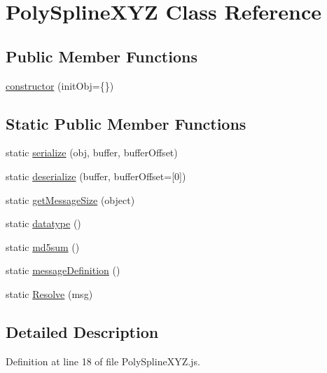 \hypertarget{class_poly_spline_x_y_z}{}\section{Poly\+Spline\+X\+YZ Class Reference}
\label{class_poly_spline_x_y_z}
\subsection*{Public Member Functions}
\begin{DoxyCompactItemize}
\item 
\hyperlink{class_poly_spline_x_y_z_a9f4d8d7d7d7d21141967cfa257d5d10b}{constructor} (init\+Obj=\{\})
\end{DoxyCompactItemize}
\subsection*{Static Public Member Functions}
\begin{DoxyCompactItemize}
\item 
static \hyperlink{class_poly_spline_x_y_z_a893425ffcaa6422399986ef9c54a4143}{serialize} (obj, buffer, buffer\+Offset)
\item 
static \hyperlink{class_poly_spline_x_y_z_adb999f8db5c294fe0ccb7a9ea2df6eb0}{deserialize} (buffer, buffer\+Offset=\mbox{[}0\mbox{]})
\item 
static \hyperlink{class_poly_spline_x_y_z_aa6e3cda5b53c89f2b01584886b3f8352}{get\+Message\+Size} (object)
\item 
static \hyperlink{class_poly_spline_x_y_z_a851cf835486d3baf87a903ebfc54148e}{datatype} ()
\item 
static \hyperlink{class_poly_spline_x_y_z_af3bfd728ed6ec2ec81ae53e06bdf4017}{md5sum} ()
\item 
static \hyperlink{class_poly_spline_x_y_z_aa6d28fbc1cc4c796ae67e4bfb1a79dea}{message\+Definition} ()
\item 
static \hyperlink{class_poly_spline_x_y_z_a3b5b82069a46c5d9b04613b76d186d33}{Resolve} (msg)
\end{DoxyCompactItemize}


\subsection{Detailed Description}


Definition at line 18 of file Poly\+Spline\+X\+Y\+Z.\+js.



